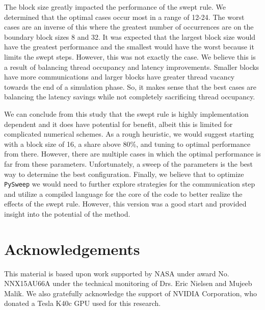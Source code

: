 \documentclass[review]{elsarticle}
\def\pysweep{\texttt{PySweep}}
\begin{document}
The block size greatly impacted the performance of the swept rule. We determined that the optimal cases occur most in a range of 12-24. The worst cases are an inverse of this where the greatest number of occurrences are on the boundary block sizes 8 and 32. It was expected that the largest block size would have the greatest performance and the smallest would have the worst because it limits the swept steps. However, this was not exactly the case. We believe this is a result of balancing thread occupancy and latency improvements. Smaller blocks have more communications and larger blocks have greater thread vacancy towards the end of a simulation phase. So, it makes sense that the best cases are balancing the latency savings while not completely sacrificing thread occupancy. 

We can conclude from this study that the swept rule is highly implementation dependent and it does have potential for benefit, albeit this is limited for complicated numerical schemes. As a rough heuristic, we would suggest starting with a block size of 16, a share above 80\%, and tuning to optimal performance from there. However, there are multiple cases in which the optimal performance is far from these parameters. Unfortunately, a sweep of the parameters is the best way to determine the best configuration. Finally, we believe that to optimize \pysweep{} we would need to further explore strategies for the communication step and utilize a compiled language for the core of the code to better realize the effects of the swept rule. However, this version was a good start and provided insight into the potential of the method. 

\section{Acknowledgements}
This material is based upon work supported by NASA under award No. NNX15AU66A under the technical monitoring of Drs. Eric Nielsen and Mujeeb Malik. We also gratefully acknowledge the support of NVIDIA Corporation, who donated a
Tesla K40c GPU used for this research.




\appendix
\renewcommand*{\thesection}{\appendixname~\Alph{section}}
\end{document}
